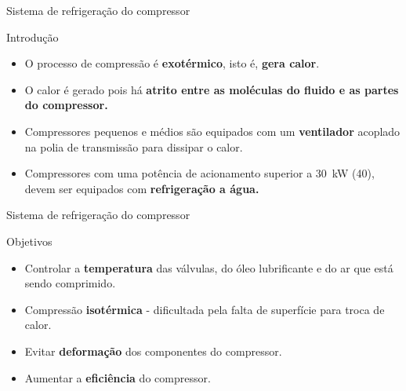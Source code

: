 \begin{frame}{Sistema de refrigeração do compressor}
\begin{block}{Introdução}
	\begin{itemize}
		\item O processo de compressão é \textbf{exotérmico}, isto é, \textbf{gera calor}.
		\item O calor é gerado pois há \textbf{atrito entre as moléculas do fluido e as partes do compressor.}
		\item Compressores pequenos e médios são equipados com um \textbf{ventilador} acoplado na polia de transmissão para dissipar o calor.
		\item Compressores com uma potência de acionamento superior a \SI{30}{\kilo\watt}	(\SI{40}{\HP}), devem ser equipados com \textbf{refrigeração a água.}
	\end{itemize}
\end{block}
\end{frame}


\begin{frame}{Sistema de refrigeração do compressor}
	\begin{block}{Objetivos}
		\begin{itemize}
			\item Controlar a \textbf{temperatura} das válvulas, do óleo lubrificante e do ar que está sendo comprimido.
			\item Compressão \textbf{isotérmica} - dificultada pela falta de superfície para troca de calor.
			\item Evitar \textbf{deformação} dos componentes do compressor.
			\item Aumentar a \textbf{eficiência} do compressor.
		\end{itemize}
	\end{block}
\end{frame}



